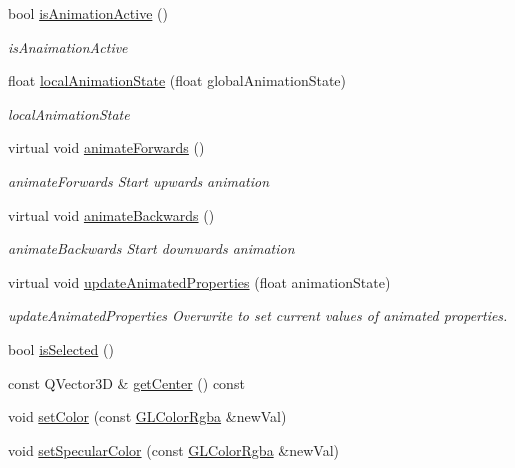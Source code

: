 \begin{DoxyCompactItemize}
bool \mbox{\hyperlink{class_g_l_body_a78e66df2ed6e8277d3363054b0ad0f2e}{is\+Animation\+Active}} ()
\begin{DoxyCompactList}\small\item\em is\+Anaimation\+Active \end{DoxyCompactList}\item 
float \mbox{\hyperlink{class_g_l_body_a30ff6f538a3966b06b2f07739070d14d}{local\+Animation\+State}} (float global\+Animation\+State)
\begin{DoxyCompactList}\small\item\em local\+Animation\+State \end{DoxyCompactList}\item 
virtual void \mbox{\hyperlink{class_g_l_body_aebb22dadd619ce98ca7c72d3970e65c9}{animate\+Forwards}} ()
\begin{DoxyCompactList}\small\item\em animate\+Forwards Start upwards animation \end{DoxyCompactList}\item 
virtual void \mbox{\hyperlink{class_g_l_body_abb7d94cef839384559975654a9729a2f}{animate\+Backwards}} ()
\begin{DoxyCompactList}\small\item\em animate\+Backwards Start downwards animation \end{DoxyCompactList}\item 
virtual void \mbox{\hyperlink{class_g_l_body_a13dc56abce31b668719ff6cc53e1970a}{update\+Animated\+Properties}} (float animation\+State)
\begin{DoxyCompactList}\small\item\em update\+Animated\+Properties Overwrite to set current values of animated properties. \end{DoxyCompactList}\item 
bool \mbox{\hyperlink{class_g_l_body_aed7512fc5612d8a8a00b49110b4fc68d}{is\+Selected}} ()
\item 
const Q\+Vector3D \& \mbox{\hyperlink{class_g_l_body_a80879471b9a5e1fd66dd7191c161d92c}{get\+Center}} () const
\item 
void \mbox{\hyperlink{class_g_l_body_a6101fd66bc1bfcd8dabed690b87c0d78}{set\+Color}} (const \mbox{\hyperlink{class_g_l_color_rgba}{G\+L\+Color\+Rgba}} \&new\+Val)
\item 
void \mbox{\hyperlink{class_g_l_body_a90028e76cb59d81178a9a73eccffd4b1}{set\+Specular\+Color}} (const \mbox{\hyperlink{class_g_l_color_rgba}{G\+L\+Color\+Rgba}} \&new\+Val)

\end{DoxyCompactItemize}
